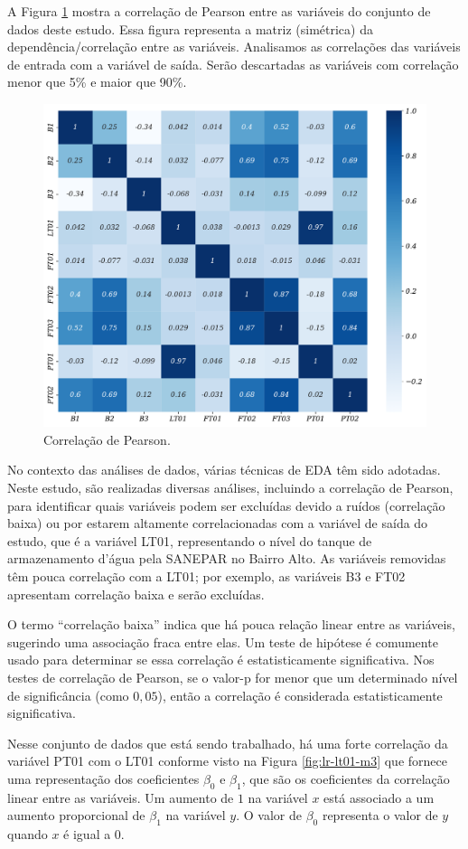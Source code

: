 A Figura \ref{fig:person} mostra a correlação de Pearson entre as variáveis do conjunto de dados deste estudo. Essa figura representa a matriz (simétrica) da dependência/correlação entre as variáveis. Analisamos as correlações das variáveis de entrada com a variável de saída. Serão descartadas as variáveis com correlação menor que 5\% e maior que 90\%.

\begin{figure}[!htb]
	\centering
	\caption{Correlação de Pearson.}
	\label{fig:person}	\includegraphics[width=0.7\linewidth]{Resultados/Figuras/person}
		
\end{figure}

No contexto das análises de dados, várias técnicas de EDA têm sido adotadas. Neste estudo, são realizadas diversas análises, incluindo a correlação de Pearson, para identificar quais variáveis podem ser excluídas devido a ruídos (correlação baixa) ou por estarem altamente correlacionadas com a variável de saída do estudo, que é a variável LT01, representando o nível do tanque de armazenamento d'água pela SANEPAR no Bairro Alto. As variáveis removidas têm pouca correlação com a LT01; por exemplo, as variáveis B3 e FT02 apresentam correlação baixa e serão excluídas.

O termo ``correlação baixa'' indica que há pouca relação linear entre as variáveis, sugerindo uma associação fraca entre elas. Um teste de hipótese é comumente usado para determinar se essa correlação é estatisticamente significativa. Nos testes de correlação de Pearson, se o valor-p for menor que um determinado nível de significância (como $0,05$), então a correlação é considerada estatisticamente significativa.

Nesse conjunto de dados que está sendo trabalhado, há uma forte correlação da variável PT01 com o LT01 conforme visto na Figura \ref{fig:lr-lt01-m3} que fornece uma representação dos coeficientes $\beta_0$ e $\beta_1$, que são os coeficientes da correlação linear entre as variáveis. Um aumento de $1$ na variável $x$ está associado a um aumento proporcional de $\beta_1$ na variável $y$. O valor de $\beta_0$ representa o valor de $y$ quando $x$ é igual a $0$.

